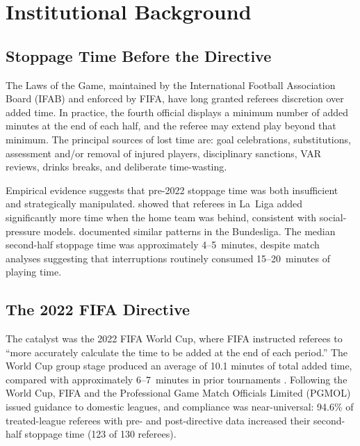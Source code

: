 \documentclass[12pt]{article}
\begin{document}
\section{Institutional Background}\label{sec:background}

\subsection{Stoppage Time Before the Directive}

The Laws of the Game, maintained by the International Football
Association Board (IFAB) and enforced by FIFA, have long granted
referees discretion over added time. In practice, the fourth official
displays a minimum number of added minutes at the end of each half, and
the referee may extend play beyond that minimum. The principal sources
of lost time are: goal celebrations, substitutions, assessment and/or
removal of injured players, disciplinary sanctions, VAR reviews, drinks
breaks, and deliberate time-wasting.

Empirical evidence suggests that pre-2022 stoppage time was both
insufficient and strategically manipulated. \citet{garicano2005favoritism}
showed that referees in La~Liga added significantly more time when the
home team was behind, consistent with social-pressure models.
\citet{dohmen2008professionals} documented similar patterns in the
Bundesliga. The median second-half stoppage time was approximately 4--5~minutes,
despite match analyses suggesting that interruptions routinely consumed
15--20~minutes of playing time.

\subsection{The 2022 FIFA Directive}

The catalyst was the 2022 FIFA World Cup, where FIFA instructed
referees to ``more accurately calculate the time to be added at the end
of each period.'' The World Cup group stage produced an average of 10.1
minutes of total added time, compared with approximately 6--7~minutes in
prior tournaments \citep{wei2024goal}. Following the World Cup, FIFA and
the Professional Game Match Officials Limited (PGMOL) issued guidance
to domestic leagues, and compliance was near-universal: 94.6\% of
treated-league referees with pre- and post-directive data increased
their second-half stoppage time (123 of 130 referees).
\end{document}
